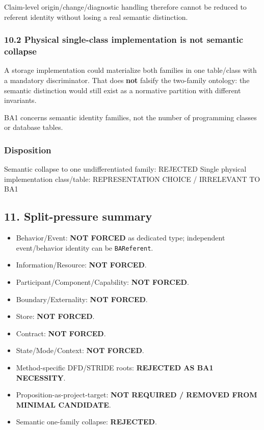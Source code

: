 \documentclass[
  10pt,
]{article}
\newenvironment{Shaded}{}{}
\newcommand{\NormalTok}[1]{#1}
\providecommand{\tightlist}{%
  \setlength{\itemsep}{0pt}\setlength{\parskip}{0pt}}
\begin{document}
Claim-level origin/change/diagnostic handling therefore cannot be
reduced to referent identity without losing a real semantic distinction.

\subsubsection{10.2 Physical single-class implementation is not semantic
collapse}\label{physical-single-class-implementation-is-not-semantic-collapse}

A storage implementation could materialize both families in one
table/class with a mandatory discriminator. That does \textbf{not}
falsify the two-family ontology: the semantic distinction would still
exist as a normative partition with different invariants.

BA1 concerns semantic identity families, not the number of programming
classes or database tables.

\subsubsection{Disposition}\label{disposition-7}

\begin{Shaded}
\begin{Highlighting}[]
\NormalTok{Semantic collapse to one undifferentiated family: REJECTED}
\NormalTok{Single physical implementation class/table: REPRESENTATION CHOICE / IRRELEVANT TO BA1}
\end{Highlighting}
\end{Shaded}

\subsection{11. Split-pressure summary}\label{split-pressure-summary}

\begin{itemize}
\tightlist
\item
  Behavior/Event: \textbf{NOT FORCED} as dedicated type; independent
  event/behavior identity can be \texttt{BAReferent}.
\item
  Information/Resource: \textbf{NOT FORCED}.
\item
  Participant/Component/Capability: \textbf{NOT FORCED}.
\item
  Boundary/Externality: \textbf{NOT FORCED}.
\item
  Store: \textbf{NOT FORCED}.
\item
  Contract: \textbf{NOT FORCED}.
\item
  State/Mode/Context: \textbf{NOT FORCED}.
\item
  Method-specific DFD/STRIDE roots: \textbf{REJECTED AS BA1 NECESSITY}.
\item
  Proposition-as-project-target: \textbf{NOT REQUIRED / REMOVED FROM
  MINIMAL CANDIDATE}.
\item
  Semantic one-family collapse: \textbf{REJECTED}.
\end{itemize}
\end{document}
